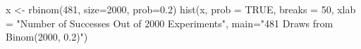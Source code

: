 \begin{Schunk}
\begin{Sinput}
  x <- rbinom(481, size=2000, prob=0.2)
  hist(x, prob = TRUE, breaks = 50,  xlab = "Number of Successes Out of 2000 Experiments", main="481 Draws from Binom(2000, 0.2)")
\end{Sinput}
\end{Schunk}
